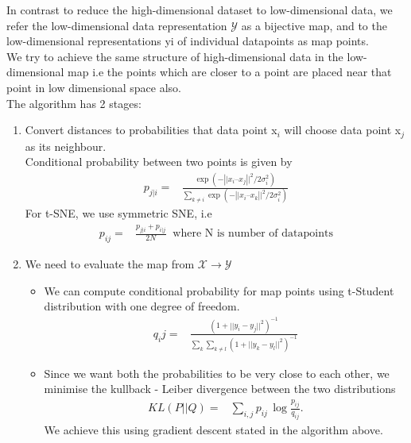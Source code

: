 \documentclass[12pt,letterpaper, onecolumn]{exam}
\begin{document}
In contrast to reduce the high-dimensional dataset to low-dimensional data, we refer the low-dimensional data representation $\mathcal{Y}$ as a bijective map, and to the low-dimensional representations yi of individual datapoints as map points.\\
We try to achieve the same structure of high-dimensional data in the low-dimensional map i.e the points which are closer to a point are placed near that point in low dimensional space also.\\
The algorithm has 2 stages:
\begin{enumerate}
\item Convert distances to probabilities that data point x$_i$ will choose data point x$_j$ as its neighbour.
\\ Conditional probability between two points is given by
\begin{align}
p_{j|i} ={}& \frac{\exp\left(-\left|| x_i – x_j\right||^2 \big/ 2\sigma_i^2\right)}{\displaystyle\sum_{k \neq i} \exp\left(-\left|| x_i – x_k\right||^2 \big/ 2\sigma_i^2\right)}
\end{align}
For t-SNE, we use symmetric SNE, i.e
\begin{align}
p_{ij} = {}& \frac{p_{j|i} + p_{i|j}}{2N} \;  \; \text{where N is number of datapoints}
\end{align}
\item We need to evaluate the map from $\mathcal{X} \rightarrow \mathcal{Y}$
\begin{itemize}
\item We can compute conditional probability for map points using t-Student distribution with one degree of freedom.
\begin{align}
q_ij = {}& \frac{(1+ ||y_i - y_j||^2)^{-1}}{\sum_{k} \sum_{k \neq l} (1+ ||y_k - y_l||^2)^{-1}}
\end{align}
\item Since we want both the probabilities to be very close to each other, we minimise the kullback - Leiber divergence between the two distributions
\begin{align}
KL(P||Q) ={}& \sum_{i, j} p_{ij} \, \log \frac{p_{ij}}{q_{ij}}.
\end{align}
We achieve this using gradient descent stated in the algorithm above.
\end{itemize}
\end{enumerate}
\end{document}
